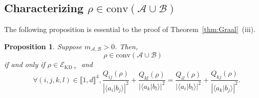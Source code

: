\documentclass[a4paper, notitlepage, 11pt]{article}
\numberwithin{equation}{section}
\newcommand{\bracket}[2]{\langle #1|#2\rangle}
\newcommand{\Acal}{{\mathcal A}}
\newcommand{\Bcal}{{\mathcal B}}
\newcommand{\EcalKDC}{{\mathcal E}_{\mathrm{KD+}}}
\newcommand{\mab}{m_{\Acal,\Bcal}}
\newcommand{\conv}[1]{\mathrm{conv}\left(#1\right)}
\newcommand{\IntEnt}[2]{\llbracket #1 , #2 \rrbracket}
\newcommand{\convAB}{\conv{\Acal \cup \Bcal}}
\newtheorem{Prop}[Theorem]{Proposition}
\begin{document}
\subsection{Characterizing $\rho \in \convAB$ }

The following proposition is essential to the proof of Theorem~\ref{thm:Graal}~(iii). 

\begin{Prop}\label{prop:CSC2}
Suppose $\mab > 0$. Then,
$$
\rho\in \convAB
$$
 if and only if $\rho\in\EcalKDC$ and
\begin{equation}\label{eq:supcond2}
\quad \forall (i,j,k,l)\in\IntEnt{1}{d}^4,  \frac{Q_{ij}(\rho)}{\left|\bracket{a_i}{b_j}\right|^2} + \frac{Q_{kl}(\rho)}{\left|\bracket{a_k}{b_l}\right|^2} =  \frac{Q_{il}(\rho)}{\left|\bracket{a_i}{b_l}\right|^2} +\frac{Q_{kj}(\rho)}{\left|\bracket{a_k}{b_j}\right|^2}.
\end{equation}
\end{Prop}
\end{document}
